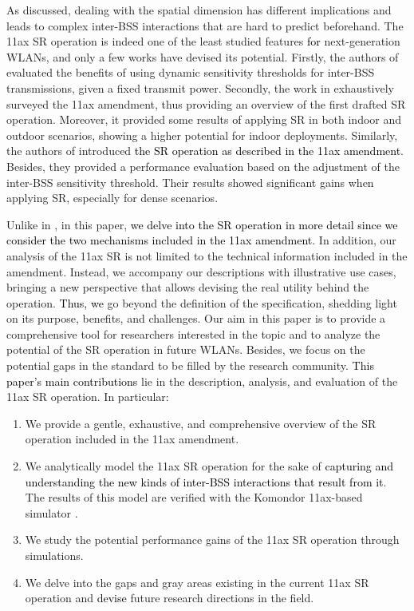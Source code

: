 \documentclass{ieeeaccess}
\begin{document}
As discussed, dealing with the spatial dimension has different implications and leads to complex inter-BSS interactions that are hard to predict beforehand. The 11ax SR operation is indeed one of the least studied features \textcolor{black}{for} next-generation WLANs, and only a few works have devised its potential. Firstly, the authors of \cite{mori2014performance} evaluated the benefits of using dynamic sensitivity thresholds for inter-BSS transmissions, given a fixed transmit power. Secondly, the work in \cite{qu2018survey} exhaustively surveyed the 11ax amendment, thus providing an overview of the first drafted SR operation. Moreover, it provided some results \textcolor{black}{of} applying SR in both indoor and outdoor scenarios, showing a higher potential for indoor deployments. Similarly, the authors of \cite{shen2018research} introduced \textcolor{black}{the SR operation as described in the 11ax amendment}. Besides, they provided a performance evaluation based on the adjustment of the inter-BSS sensitivity threshold. Their results showed significant gains when applying SR, especially for dense scenarios. 

Unlike in \cite{mori2014performance, qu2018survey, shen2018research}, in this paper, \textcolor{black}{we delve into the SR operation in more detail since we consider the two mechanisms included in the 11ax amendment}. In addition, our analysis of the 11ax SR is not limited to the technical information included in the amendment. Instead, we accompany our descriptions with illustrative use cases, bringing a new perspective that allows devising the real utility behind the operation. \textcolor{black}{Thus, we} go beyond the definition of the specification, shedding light on its purpose, benefits, and challenges. Our aim in this paper is to provide a comprehensive tool for researchers interested in the topic and to analyze the potential of the SR operation in future WLANs. Besides, we focus on the potential gaps in the standard to be filled by the research community. \textcolor{black}{This paper's main contributions} lie in the description, analysis, and evaluation of the 11ax SR operation. In particular:
\begin{enumerate}
	\item We provide a gentle, exhaustive, and comprehensive overview of the SR operation included in the 11ax amendment.
	\item We analytically model the 11ax SR operation for the sake of \textcolor{black}{capturing and understanding the new kinds of inter-BSS interactions that result from it}. The results of this model are verified with the Komondor 11ax-based simulator \cite{barrachina2019komondor}.
	\item We study the potential performance gains of the 11ax SR operation through simulations. 
	\item We delve into the gaps and gray areas existing in the current 11ax SR operation and \textcolor{black}{devise} future research directions in the field.
\end{enumerate}
\end{document}
